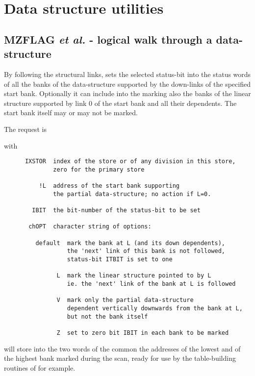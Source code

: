 \chapter{Data structure utilities}
\label{sec:H1-Data-structure-utilities}

\section{MZFLAG {\it et al.} - logical walk through a data-structure}

By following the structural links,
 sets the selected status-bit into the status words
of all the banks of the data-structure supported
by the down-links of the specified start bank.
Optionally it can include into the marking
also the banks of the linear structure supported
by link 0 of the start bank and all their dependents.
The start bank itself may or may not be marked.

The request is


with
\begin{verbatim}
      IXSTOR  index of the store or of any division in this store,
              zero for the primary store

          !L  address of the start bank supporting
              the partial data-structure; no action if L=0.

        IBIT  the bit-number of the status-bit to be set

       chOPT  character string of options:

         default  mark the bank at L (and its down dependents),
                  the 'next' link of this bank is not followed,
                  status-bit ITBIT is set to one

               L  mark the linear structure pointed to by L
                  ie. the 'next' link of the bank at L is followed

               V  mark only the partial data-structure
                  dependent vertically downwards from the bank at L,
                  but not the bank itself

               Z  set to zero bit IBIT in each bank to be marked
\end{verbatim} 

 will store into the two words of the common 
the addresses of the lowest and of the highest bank marked
during the scan, ready for use by the table-building routines
of  for example.

